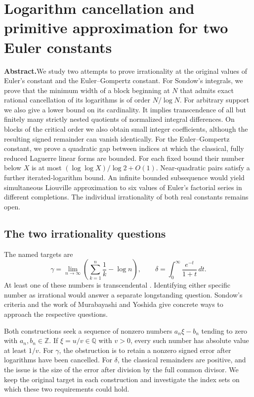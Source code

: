 \documentclass[11pt,a4paper,oneside,openany]{report}
\theoremstyle{remark}\newtheorem{remark}[theorem]{Remark}
\numberwithin{equation}{section}
\begin{document}
\chapter[Approximation for two Euler constants]{Logarithm cancellation and primitive approximation for two Euler constants}\label{chap:1}
\noindent\textbf{Abstract.}\enspace We study two attempts to prove irrationality at the original values of Euler's constant and the Euler--Gompertz constant.
For Sondow's integrals, we prove that the minimum width of a block beginning at $N$ that admits exact rational cancellation of its logarithms is of order $N/\log N$. For arbitrary support we also give a lower bound on its cardinality. It implies transcendence of all but finitely many strictly nested quotients of normalized integral differences. On blocks of the critical order we also obtain small integer coefficients, although the resulting signed remainder can vanish identically.
For the Euler--Gompertz constant, we prove a quadratic gap between indices at which the classical, fully reduced Laguerre linear forms are bounded. For each fixed bound their number below $X$ is at most $(\log\log X)/\log 2+O(1)$. Near-quadratic pairs satisfy a further iterated-logarithm bound. An infinite bounded subsequence would yield simultaneous Liouville approximation to six values of Euler's factorial series in different completions. The individual irrationality of both real constants remains open.

\section{The two irrationality questions}
The named targets are
\[
 \gamma=\lim_{n\to\infty}\left(\sum_{k=1}^n\frac1k-\log n\right),
 \qquad
 \delta=\int_0^\infty \frac{e^{-t}}{1+t}\,dt .
\]
At least one of these numbers is transcendental \cite{lagarias}. Identifying either specific number as irrational would answer a separate longstanding question. Sondow's criteria \cite{sondow} and the work of Murabayashi and Yoshida \cite{my} give concrete ways to approach the respective questions.

Both constructions seek a sequence of nonzero numbers $a_n\xi-b_n$ tending to zero with $a_n,b_n\in\mathbb Z$. If $\xi=u/v\in\mathbb Q$ with $v>0$, every such number has absolute value at least $1/v$. For $\gamma$, the obstruction is to retain a nonzero signed error after logarithms have been cancelled. For $\delta$, the classical remainders are positive, and the issue is the size of the error after division by the full common divisor. We keep the original target in each construction and investigate the index sets on which these two requirements could hold.
\end{document}
